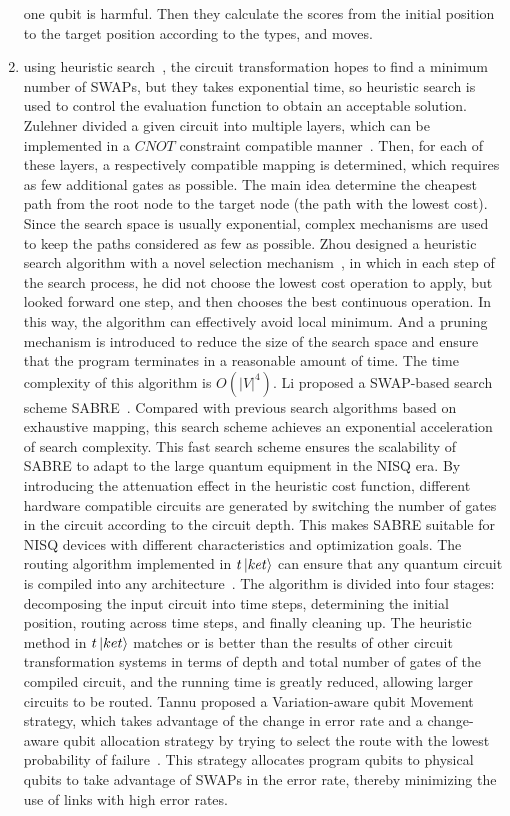 \documentclass[runningheads]{llncs}
\begin{document}
\begin{enumerate}
   one qubit is harmful. 
   Then they calculate the scores from the initial position 
   to the target position according to the types, and moves.
	\item using heuristic search~\cite{Zulehner2017,Cowtan2019,Li2018,Xiangzhen2020,2018QubitSiraichi},
	the circuit transformation hopes to find a minimum number of SWAPs, 
	but they takes exponential time, 
	so heuristic search is used to control the evaluation function 
	to obtain an acceptable solution.
	Zulehner divided a given circuit into multiple layers, 
	which can be implemented in a $CNOT$ 
	constraint compatible manner~\cite{Zulehner2017}. Then, for each of these layers, 
	a respectively compatible mapping is determined, 
	which requires as few additional gates as possible. 
	The main idea  determine the cheapest path from the root node to the target node 
	(the path with the lowest cost). Since the search space is usually exponential, 
	complex mechanisms are used to keep the paths considered as few as possible.
	Zhou designed a heuristic search algorithm with a novel selection 
	mechanism~\cite{Xiangzhen2020}, 
	in which in each step of the search process, 
	he did not choose the lowest cost operation to apply, 
	but looked forward one step, and then chooses the best continuous operation. 
	In this way, the algorithm can effectively avoid local minimum. 
	And a pruning mechanism is introduced 
	to reduce the size of the search space and ensure that the program 
	terminates in a reasonable amount of time. 
	The time complexity of this algorithm is $O(|V|^{4})$.
	Li proposed a SWAP-based search scheme SABRE~\cite{Li2018}. 
	Compared with previous search algorithms based on exhaustive mapping, 
	this search scheme achieves an exponential acceleration of search complexity.
	This fast search scheme ensures the scalability of SABRE to adapt to the large 
	quantum equipment in the NISQ era.
	By introducing the attenuation effect in the heuristic cost function, 
	different hardware compatible circuits are generated by switching the number 
	of gates in the circuit according to the circuit depth.
	This makes SABRE suitable for NISQ devices with different characteristics and optimization goals.
	The routing algorithm implemented in $t\left\vert{ket}\right\rangle$ can ensure 
	that any quantum circuit is compiled into any architecture~\cite{Cowtan2019}.
	The algorithm is divided into four stages: 
	decomposing the input circuit into time steps, 
	determining the initial position, 
	routing across time steps, and finally cleaning up.
	The heuristic method in $t\left\vert{ket}\right\rangle$ matches or is better than the results of 
	other circuit transformation systems in terms of depth and total number of gates of 
	the compiled circuit, and the running time is greatly reduced, allowing larger circuits to be routed.
	Tannu proposed a Variation-aware qubit Movement strategy, 
	which takes advantage of the change in error rate and a change-aware qubit allocation 
	strategy by trying to select the route with the lowest probability of failure~\cite{Tannu2019}. 
	This strategy allocates program qubits to physical qubits to take advantage 
	of SWAPs in the error rate, thereby minimizing the use of links with high error rates.
\end{enumerate} 
\end{document}
